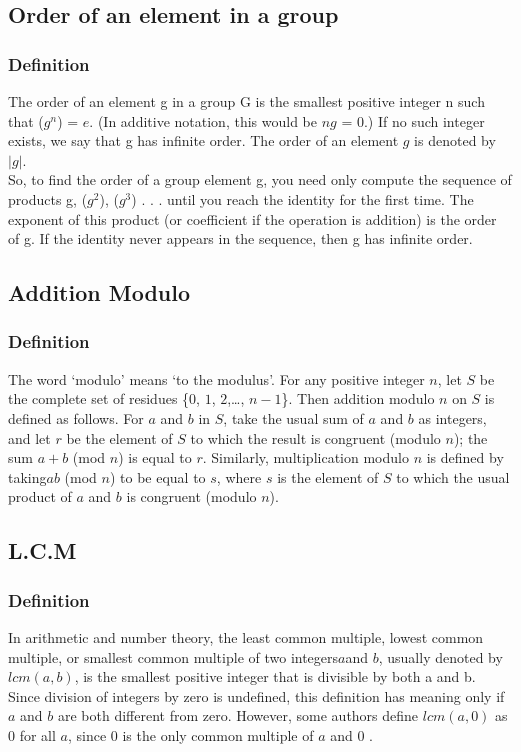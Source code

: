 \documentclass{article}
\begin{document}
\subsection{Order of an element in a group}
\subsubsection{Definition}
The order of an element g in a group G is the smallest positive integer n
such that ($g^n$) = $e$. (In additive notation, this would be $ng$ = 0.) If no such
integer exists, we say that g has infinite order. The order of an element $g$
is denoted by $|g|$.\\
So, to find the order of a group element g, you need only compute the
sequence of products g, ($g^2$), ($g^3$) . . .  until you reach the identity for the first time. The exponent of this product (or coefficient if the operation is addition) is the order of g. If the identity never appears in the sequence, then
g has infinite order.\cite{gallian2021contemporary}
\subsection{Addition Modulo}
\subsubsection{Definition}
The word ‘modulo’ means ‘to the modulus’. For any positive integer $n$, let $S$ be the complete set of residues \{$0$, $1$, $2$,…, $n-1$\}. Then addition modulo $n$ on $S$ is defined as follows. For $a$ and $b$ in $S$, take the usual sum of $a$ and $b$ as integers, and let $r$ be the element of $S$ to which the result is congruent (modulo $n$); the sum $a+b$ (mod $n$) is equal to $r$. Similarly, multiplication modulo $n$ is defined by taking$ ab$ (mod $n$) to be equal to $s$, where $s$ is the element of $S$ to which the usual product of $a$ and $b$ is congruent (modulo $n$).\cite{clapham2014concise}
\subsection{L.C.M}
\subsubsection{Definition}
In arithmetic and number theory, the least common multiple, lowest common multiple, or smallest common multiple of two integers$ a $and $ b$, usually denoted by $lcm(a, b)$, is the smallest positive integer that is divisible by both a and b. Since division of integers by zero is undefined, this definition has meaning only if $a$ and $b$ are both different from zero. However, some authors define $lcm(a,0)$ as $0$ for all $a$, since $0$ is the only common multiple of $a$ and $0$ .\cite{hardy1979introduction}
\end{document}
